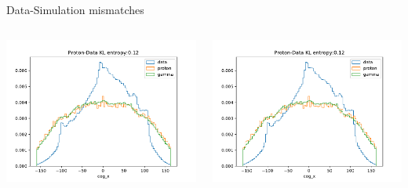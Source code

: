 \begin{frame}[t]{Data-Simulation mismatches}
\begin{columns}[onlytextwidth]
    \begin{column}{0.475\textwidth}
        \includegraphics[width=1.1\textwidth,page=10]{fig/gpd_mc_comp_cuts_n.pdf}
    \end{column}
    \begin{column}{0.475\textwidth}
        \includegraphics[width=1.1\textwidth,page=20]{fig/gpd_mc_comp_cuts_n.pdf}
    \end{column}
\end{columns}
\end{frame}

